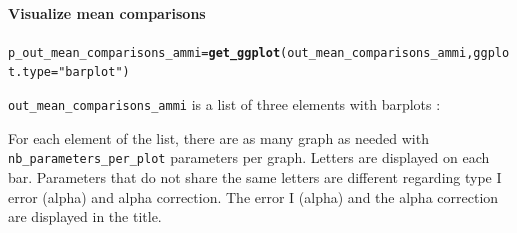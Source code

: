 \documentclass{article}\usepackage[]{graphicx}\usepackage[]{color}
\makeatletter
\newcommand{\hlstr}[1]{\textcolor[rgb]{0.192,0.494,0.8}{#1}}%
\newcommand{\hlstd}[1]{\textcolor[rgb]{0.345,0.345,0.345}{#1}}%
\newcommand{\hlkwb}[1]{\textcolor[rgb]{0.69,0.353,0.396}{#1}}%
\newcommand{\hlkwc}[1]{\textcolor[rgb]{0.333,0.667,0.333}{#1}}%
\newcommand{\hlkwd}[1]{\textcolor[rgb]{0.737,0.353,0.396}{\textbf{#1}}}%
\newenvironment{kframe}{%
 \def\at@end@of@kframe{}%
 \ifinner\ifhmode%
  \def\at@end@of@kframe{\end{minipage}}%
  \begin{minipage}{\columnwidth}%
 \fi\fi%
 \def\FrameCommand##1{\hskip\@totalleftmargin \hskip-\fboxsep
 \colorbox{shadecolor}{##1}\hskip-\fboxsep
     \hskip-\linewidth \hskip-\@totalleftmargin \hskip\columnwidth}%
 \MakeFramed {\advance\hsize-\width
   \@totalleftmargin\z@ \linewidth\hsize
   \@setminipage}}%
 {\par\unskip\endMakeFramed%
 \at@end@of@kframe}
\newenvironment{knitrout}{}{} %
\makeatother
\begin{document}
\paragraph{Visualize mean comparisons}

\begin{knitrout}
\color{fgcolor}\begin{kframe}
\begin{alltt}
\hlstd{p_out_mean_comparisons_ammi} \hlkwb{=} \hlkwd{get_ggplot}\hlstd{(out_mean_comparisons_ammi,} \hlkwc{ggplot.type} \hlstd{=} \hlstr{"barplot"}\hlstd{)}
\end{alltt}
\end{kframe}
\end{knitrout}

\texttt{out\_mean\_comparisons\_ammi} is a list of three elements with barplots :

For each element of the list, there are as many graph as needed with \texttt{nb\_parameters\_per\_plot} parameters per graph.
Letters are displayed on each bar. Parameters that do not share the same letters are different regarding type I error (alpha) and alpha correction. 
The error I (alpha) and the alpha correction are displayed in the title. 
\end{document}
